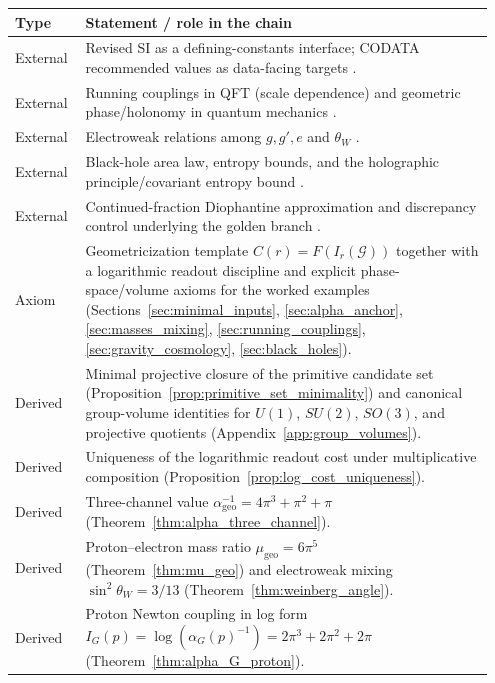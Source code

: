 \begin{table}[t]
\centering
\begin{tabular}{@{}p{0.14\linewidth}p{0.81\linewidth}@{}}
\toprule
\textbf{Type} & \textbf{Statement / role in the chain} \\
\midrule
External & Revised SI as a defining-constants interface; CODATA recommended values as data-facing targets \cite{BIPMSI2019,CODATA2022RMP}. \\
External & Running couplings in QFT (scale dependence) and geometric phase/holonomy in quantum mechanics \cite{GellMannLow1954,PeskinSchroeder1995,Simon1983,Berry1984,WilczekZee1984}. \\
External & Electroweak relations among $g,g',e$ and $\theta_W$ \cite{Glashow1961,Weinberg1967,Salam1968,PeskinSchroeder1995}. \\
External & Black-hole area law, entropy bounds, and the holographic principle/covariant entropy bound \cite{Bekenstein1973,Bekenstein1981,BardeenCarterHawking1973,Hawking1975,Wald1984,Wald1993Noether,tHooft1993,Susskind1995,Bousso2002}. \\
External & Continued-fraction Diophantine approximation and discrepancy control underlying the golden branch \cite{Khinchin1964,KuipersNiederreiter1974,Slater1967}. \\
Axiom & Geometricization template $C(r)=F(I_r(\mathcal{G}))$ together with a logarithmic readout discipline and explicit phase-space/volume axioms for the worked examples (Sections~\ref{sec:minimal_inputs}, \ref{sec:alpha_anchor}, \ref{sec:masses_mixing}, \ref{sec:running_couplings}, \ref{sec:gravity_cosmology}, \ref{sec:black_holes}). \\
Derived & Minimal projective closure of the primitive candidate set (Proposition~\ref{prop:primitive_set_minimality}) and canonical group-volume identities for $U(1)$, $SU(2)$, $SO(3)$, and projective quotients (Appendix~\ref{app:group_volumes}). \\
Derived & Uniqueness of the logarithmic readout cost under multiplicative composition (Proposition~\ref{prop:log_cost_uniqueness}). \\
Derived & Three-channel value $\alpha_{\mathrm{geo}}^{-1}=4\pi^3+\pi^2+\pi$ (Theorem~\ref{thm:alpha_three_channel}). \\
Derived & Proton--electron mass ratio $\mu_{\mathrm{geo}}=6\pi^5$ (Theorem~\ref{thm:mu_geo}) and electroweak mixing $\sin^2\theta_W=3/13$ (Theorem~\ref{thm:weinberg_angle}). \\
Derived & Proton Newton coupling in log form $I_G(p)=\log(\alpha_G(p)^{-1})=2\pi^3+2\pi^2+2\pi$ (Theorem~\ref{thm:alpha_G_proton}). \\

\end{tabular}
\end{table}
